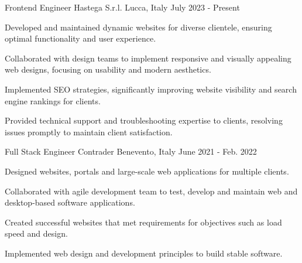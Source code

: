 

\begin{cventries}

  \cventry
    {Frontend Engineer} %
    {Hastega S.r.l.} %
    {Lucca, Italy} %
    {July 2023 - Present} %
    {
      \begin{cvitems} %
        \item {Developed and maintained dynamic websites for diverse clientele, ensuring optimal functionality and user experience.}
        \item {Collaborated with design teams to implement responsive and visually appealing web designs, focusing on usability and modern aesthetics.}
        \item {Implemented SEO strategies, significantly improving website visibility and search engine rankings for clients.}
        \item {Provided technical support and troubleshooting expertise to clients, resolving issues promptly to maintain client satisfaction.}
      \end{cvitems}
    }

  \cventry
    {Full Stack Engineer} %
    {Contrader} %
    {Benevento, Italy} %
    {June 2021 - Feb. 2022} %
    {
      \begin{cvitems} %
        \item {Designed websites, portals and large-scale web applications for multiple clients.}
        \item {Collaborated with agile development team to test, develop and maintain web and desktop-based software applications.}
        \item {Created successful websites that met requirements for objectives such as load speed and design.}
        \item {Implemented web design and development principles to build stable software.}
      \end{cvitems}
    }

\end{cventries}
